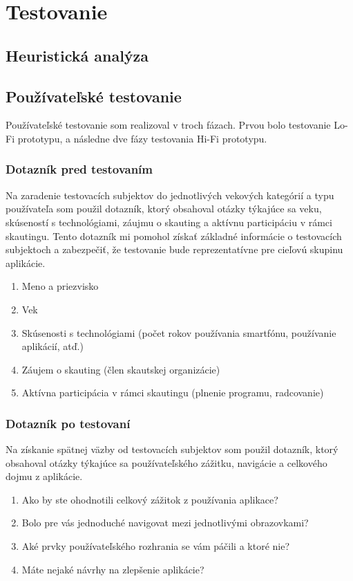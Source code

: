 \chapter{Testovanie}

\section{Heuristická analýza}


\section{Používateľské testovanie}
Používateľské testovanie som realizoval v troch fázach. Prvou bolo testovanie Lo-Fi prototypu, a následne dve fázy testovania Hi-Fi prototypu. 

\subsection{Dotazník pred testovaním}
Na zaradenie testovacích subjektov do jednotlivých vekových kategórií a typu používateľa som použil dotazník, ktorý obsahoval otázky týkajúce sa veku, skúseností s technológiami, záujmu o skauting a aktívnu participáciu v rámci skautingu. Tento dotazník mi pomohol získať základné informácie o testovacích subjektoch a zabezpečiť, že testovanie bude reprezentatívne pre cieľovú skupinu aplikácie.

\begin{enumerate}
    \item Meno a priezvisko
    \item Vek
    \item Skúsenosti s technológiami (počet rokov používania smartfónu, používanie aplikácií, atď.)
    \item Záujem o skauting (člen skautskej organizácie)
    \item Aktívna participácia v rámci skautingu (plnenie programu, radcovanie)
\end{enumerate}

\subsection{Dotazník po testovaní}
Na získanie spätnej väzby od testovacích subjektov som použil dotazník, ktorý obsahoval otázky týkajúce sa používateľského zážitku, navigácie a celkového dojmu z aplikácie. 

\begin{enumerate}
    \item Ako by ste ohodnotili celkový zážitok z používania aplikace?
    \item Bolo pre vás jednoduché navigovat mezi jednotlivými obrazovkami?
    \item Aké prvky používateľského rozhrania se vám páčili a ktoré nie?
    \item Máte nejaké návrhy na zlepšenie aplikácie?
\end{enumerate}

